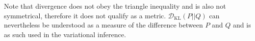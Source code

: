 Note that divergence does not obey the triangle inequality and is also not symmetrical, therefore it does not qualify as a metric.
$\mathcal{D}_{\mathrm{KL}}(P||Q)$ can nevertheless be understood as a measure of the difference between $P$ and $Q$ and is as such used in the variational inference.















